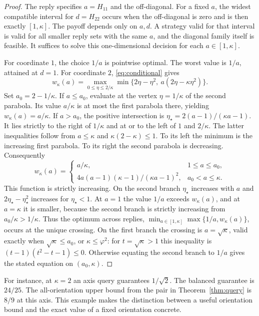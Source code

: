\documentclass[11pt]{article}
\begin{document}
\begin{proof}
The reply specifies \(a=H_{11}\) and the off-diagonal. For a fixed
\(a\), the widest compatible interval for \(d=H_{22}\) occurs when the
off-diagonal is zero and is then exactly \([1,\kappa]\).
The payoff depends only on \(a,d\). A strategy valid for that interval
is valid for all smaller reply sets with the same \(a\), and the
diagonal family itself is feasible. It suffices to solve this
one-dimensional decision for each \(a\in[1,\kappa]\).

For coordinate \(1\), the choice \(1/a\) is pointwise optimal.
The worst value is \(1/a\), attained at \(d=1\). For coordinate \(2\),
\eqref{eq:conditional} gives
\[
 w_\kappa(a)=\max_{0\le\eta\le2/\kappa}
     \min\{2\eta-\eta^2,\ a(2\eta-\kappa\eta^2)\}.
\]
Set \(a_0=2-1/\kappa\). If \(a\le a_0\), evaluate at the vertex
\(\eta=1/\kappa\) of the second parabola. Its value \(a/\kappa\)
is at most the first parabola there, yielding
\(w_\kappa(a)=a/\kappa\). If \(a>a_0\), the positive intersection is
\(\eta_\star=2(a-1)/(\kappa a-1)\). It lies strictly to the right
of \(1/\kappa\) and at or to the left of \(1\) and \(2/\kappa\).
The latter inequalities follow from \(a\le\kappa\) and
\(\kappa(2-\kappa)\le1\). To its left the minimum is the increasing
first parabola. To its right the second parabola is decreasing.
Consequently
\[
 w_\kappa(a)=
 \begin{cases}
 a/\kappa,&1\le a\le a_0,\\
 4a(a-1)(\kappa-1)/(\kappa a-1)^2,&a_0<a\le\kappa .
 \end{cases}
\]
This function is strictly increasing. On the second branch
\(\eta_\star\) increases with \(a\) and \(2\eta_\star-\eta_\star^2\)
increases for \(\eta_\star<1\). At \(a=1\) the value \(1/a\) exceeds
\(w_\kappa(a)\), and at \(a=\kappa\) it is smaller, because the
second branch is strictly increasing from \(a_0/\kappa>1/\kappa\).
Thus the optimum across replies,
\(\min_{a\in[1,\kappa]}\max\{1/a,w_\kappa(a)\}\), occurs at the unique
crossing. On the first branch the crossing is \(a=\sqrt\kappa\), valid
exactly when \(\sqrt\kappa\le a_0\), or \(\kappa\le\varphi^2\):
for \(t=\sqrt\kappa>1\) this inequality is
\((t-1)(t^2-t-1)\le0\). Otherwise equating the second branch to \(1/a\)
gives the stated equation on \((a_0,\kappa)\).
\end{proof}

For instance, at \(\kappa=2\) an axis query guarantees \(1/\sqrt2\).
The balanced guarantee is \(24/25\). The all-orientation upper bound
from the pair in Theorem~\ref{thm:query} is \(8/9\) at this axis.
This example makes the distinction between a useful orientation bound
and the exact value of a fixed orientation concrete.
\end{document}
